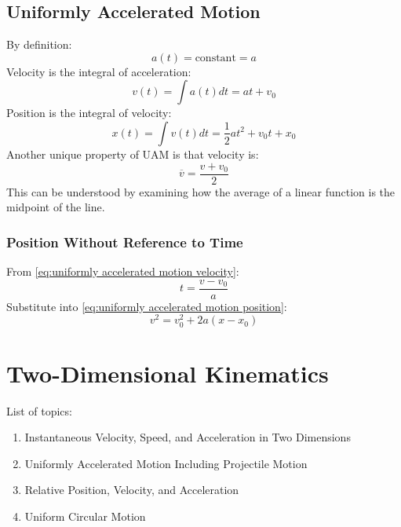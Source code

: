 \documentclass[article, 11pt]{article}
\theoremstyle{definition}
\begin{document}
        \subsection{Uniformly Accelerated Motion}
        By definition:
        \begin{equation}
            a(t) = \text{constant} = a
            \label{eq:uniformly accelerated motion acceleration}
        \end{equation}
        Velocity is the integral of acceleration:
        \begin{equation}
            v(t) = \int a(t) dt = at + v_0
            \label{eq:uniformly accelerated motion velocity}
        \end{equation}
        Position is the integral of velocity:
        \begin{equation}
            x(t) = \int v(t) dt = \frac{1}{2}at^2 + v_0t + x_0
            \label{eq:uniformly accelerated motion position}
        \end{equation}
        Another unique property of UAM is that velocity is:
        \begin{equation}
            \overline{v} = \frac{v + v_0}{2}
        \end{equation}
        This can be understood by examining how the average of a linear function is the midpoint of the line.
        \subsubsection{Position Without Reference to Time}
        From \autoref{eq:uniformly accelerated motion velocity}:
        \begin{equation*}
            t = \frac{v - v_0}{a}
        \end{equation*}
        Substitute into \autoref{eq:uniformly accelerated motion position}:
        \begin{equation}
            v^2 = v_0^2 + 2a(x - x_0)
            \label{eq:position without reference to time}
        \end{equation}
    \section{Two-Dimensional Kinematics}
    List of topics:
    \begin{enumerate}
        \item Instantaneous Velocity, Speed, and Acceleration in Two Dimensions
        \item Uniformly Accelerated Motion Including Projectile Motion
        \item Relative Position, Velocity, and Acceleration
        \item Uniform Circular Motion
    \end{enumerate}
\end{document}
